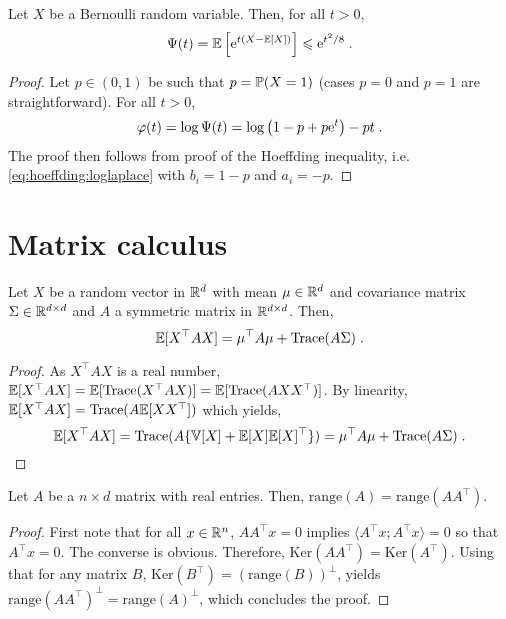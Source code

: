 \begin{shaded}
\begin{lemma}
\label{lem:bernoulli:bound}
Let $X$ be a Bernoulli random variable. Then, for all $t>0$,
\[
\Psi(t) = \mathbb{E}\left[\mathrm{e}^{t\left(X-\mathbb{E}[X]\right)}\right] \leqslant \mathrm{e}^{t^2/8}\;.
\]
\end{lemma}
\end{shaded}

\begin{proof}
Let $p\in(0,1)$ be such that $p = \mathbb{P}(X=1)$ (cases $p=0$ and $p=1$ are straightforward). For all $t>0$,
\[
\varphi(t) = \log \Psi(t) = \log\left(1-p+p\mathrm{e}^t\right) - pt\;.
\]
The proof then follows from proof of the Hoeffding inequality, i.e. \eqref{eq:hoeffding:loglaplace} with $b_i =1-p$ and $a_i = -p$.
\end{proof}



\section{Matrix calculus}

\begin{lemma}
\label{ref:expectation:quadratic:trasform}
Let $X$ be a random vector in $\mathbb{R}^d$ with mean $\mu\in\mathbb{R}^d$ and covariance matrix $\Sigma\in\mathbb{R}^{d\times d}$ and $A$ a symmetric matrix in $\mathbb{R}^{d\times d}$. Then,
$$
\mathbb{E}[X^\top A X] = \mu^\top A \mu + \mathrm{Trace}(A\Sigma)\;.
$$
\end{lemma}
\begin{proof}
As $X^\top A X$ is a real number, $\mathbb{E}[X^\top A X] = \mathbb{E}[\mathrm{Trace}(X^\top A X)] =  \mathbb{E}[\mathrm{Trace}(AXX^\top )]$. By linearity, $\mathbb{E}[X^\top A X] = \mathrm{Trace}(A\mathbb{E}[XX^\top])$ which yields,
$$
\mathbb{E}[X^\top A X] =   \mathrm{Trace}(A\{\mathbb{V}[X] + \mathbb{E}[X]\mathbb{E}[X]^\top\}) =  \mu^\top A \mu + \mathrm{Trace}(A\Sigma)\;.
$$
\end{proof}

\begin{lemma}
\label{lem:im:transpose}
Let $A$ be a $n\times d$ matrix with real entries. Then, $\mathrm{range}(A)=\mathrm{range}(A A^\top)$.
\end{lemma}
\begin{proof}
First note that for all $x\in\mathbb{R}^n$, $AA^\top x=0$ implies $\langle A^\top x; A^\top x\rangle=0$ so that $A^\top x=0$. The converse is obvious. Therefore, $\mathrm{Ker}(A A^\top)= \mathrm{Ker}(A^\top)$. Using that for any matrix $B$, $\mathrm{Ker}(B^\top)=(\mathrm{range}(B))^\perp$, yields $\mathrm{range}(A A^\top)^\perp=\mathrm{range}(A)^\perp$, which concludes the proof.
\end{proof}

